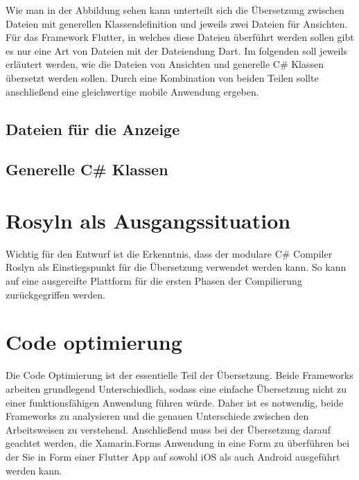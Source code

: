 Wie man in der Abbildung sehen kann unterteilt sich die Übersetzung zwischen Dateien mit generellen Klassendefinition und jeweils zwei Dateien für Ansichten.  Für das Framework Flutter,  in welches diese Dateien überführt werden sollen gibt es nur eine Art von Dateien mit der Dateiendung Dart.
Im folgenden soll jeweils erläutert werden, wie die Dateien von Ansichten und generelle C\# Klassen übersetzt werden sollen.  Durch eine Kombination von beiden Teilen sollte anschließend eine gleichwertige mobile Anwendung ergeben. 

\subsection{Dateien für die Anzeige }
\subsection{Generelle C\# Klassen}



\section{Rosyln als Ausgangssituation}
Wichtig für den Entwurf ist die Erkenntnis,  dass der modulare C\# Compiler Roslyn als Einstiegspunkt für die Übersetzung verwendet werden kann.  So kann auf eine ausgereifte Plattform für die ersten Phasen der Compilierung zurückgegriffen werden.




\section{Code optimierung}
Die Code Optimierung ist der essentielle Teil der Übersetzung.  Beide Frameworks arbeiten grundlegend Unterschiedlich,  sodass eine einfache Übersetzung nicht zu einer funktionsfähigen Anwendung führen würde.  Daher ist es notwendig,  beide Frameworks zu analysieren und die genauen Unterschiede zwischen den Arbeitsweisen zu verstehend. Anschließend muss bei der Übersetzung darauf geachtet werden,  die Xamarin.Forms Anwendung in eine Form zu überführen bei der Sie in Form einer Flutter App auf sowohl iOS als auch Android ausgeführt werden kann. 